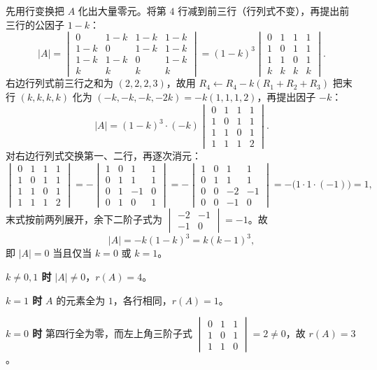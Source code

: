 \begin{solution}
先用行变换把 $A$ 化出大量零元。将第 $4$ 行减到前三行（行列式不变），再提出前三行的公因子 $1-k$：
\[
|A|=\begin{vmatrix}0&1-k&1-k&1-k\\1-k&0&1-k&1-k\\1-k&1-k&0&1-k\\k&k&k&k\end{vmatrix}
=(1-k)^{3}\begin{vmatrix}0&1&1&1\\1&0&1&1\\1&1&0&1\\k&k&k&k\end{vmatrix}.
\]
右边行列式前三行之和为 $(2,2,2,3)$，故用 $R_4\leftarrow R_4-k(R_1+R_2+R_3)$
把末行 $(k,k,k,k)$ 化为 $(-k,-k,-k,-2k)=-k(1,1,1,2)$，再提出因子 $-k$：
\[
|A|=(1-k)^{3}\cdot(-k)\begin{vmatrix}0&1&1&1\\1&0&1&1\\1&1&0&1\\1&1&1&2\end{vmatrix}.
\]
对右边行列式交换第一、二行，再逐次消元：
\[
\begin{vmatrix}0&1&1&1\\1&0&1&1\\1&1&0&1\\1&1&1&2\end{vmatrix}
=-\begin{vmatrix}1&0&1&1\\0&1&1&1\\0&1&-1&0\\0&1&0&1\end{vmatrix}
=-\begin{vmatrix}1&0&1&1\\0&1&1&1\\0&0&-2&-1\\0&0&-1&0\end{vmatrix}
=-\bigl(1\cdot1\cdot(-1)\bigr)=1,
\]
末式按前两列展开，余下二阶子式为 $\begin{vmatrix}-2&-1\\-1&0\end{vmatrix}=-1$。故
\[
|A|=-k(1-k)^{3}=k(k-1)^{3},
\]
即 $|A|=0$ 当且仅当 $k=0$ 或 $k=1$。

\textbf{$k\ne0,1$ 时} $|A|\ne0$，$r(A)=4$。

\textbf{$k=1$ 时} $A$ 的元素全为 $1$，各行相同，$r(A)=1$。

\textbf{$k=0$ 时} 第四行全为零，而左上角三阶子式
$\begin{vmatrix}0&1&1\\1&0&1\\1&1&0\end{vmatrix}=2\ne0$，故 $r(A)=3$。
\end{solution}

